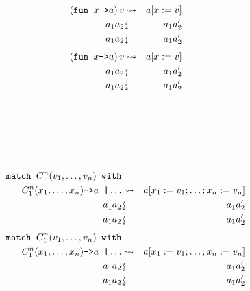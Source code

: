 \documentclass{beamer}
\newcommand{\assign}{:=}
\newcommand{\downsquigarrow}{{\mbox{\rotatebox[origin=c]{-90}{$\rightsquigarrow$}}}}
\newcommand{\tmverbatim}[1]{\text{{\ttfamily{#1}}}}
\begin{document}
\begin{eqnarray*}
  \left( \text{\tmverbatim{fun }} x \text{\tmverbatim{->}} a \right) v &
  \rightsquigarrow & a [x \assign v]\\
  a_1 a_2 & \downsquigarrow & a_1 a_2'\\
  a_1 a_2 & \downsquigarrow & a_1 a_2'
\end{eqnarray*}
{\newpage}
\begin{eqnarray*}
  \left( \text{\tmverbatim{fun }} x \text{\tmverbatim{->}} a \right) v &
  \rightsquigarrow & a [x \assign v]\\
  a_1 a_2 & \downsquigarrow & a_1 a_2'\\
  a_1 a_2 & \downsquigarrow & a_1 a_2'
\end{eqnarray*}
{\hlstd{ \ }}{}{\hlopt{+ }}{\hlopt{(}}{}{\hlopt{+
}}{\hlopt{(}}{}{}{}{\hlendline{}}\\
{\hlstd{ \ \ \ \ \ \ \ \ \ \ \ \ \ \ }}{\hlopt{\textbar }}{}{\hlopt{-> }}{}{\hlendline{}}\\
{\hlstd{ \ \ \ }}{\hlopt{ \ \ \ \ \ \ \ \ \ \ \textbar }}{}{\hlopt{(}}{}{\hlopt{, }}{}{\hlopt{) -> }}{}{\hlopt{+ }}{\hlopt{(}}{}{\hlopt{(}}{}{}{\hlopt{->}}{\hlendline{}}\\
{\hlstd{ \ \ \ \ \ \ \ \ \ \ \ \ \ \ \ \ }}{}{}{}{\hlendline{}}\\
{\hlstd{ \ \ \ \ \ \ \ \ \ \ \ \ \ \ }}{\hlopt{ \ \ \ \textbar }}{}{\hlopt{-> }}{}{\hlendline{}}\\
{\hlstd{ \ \ \ }}{\hlopt{ \ \ \ \ \ \ \ \ \ \ \ \ \ \ \textbar }}{}{\hlopt{(}}{}{\hlopt{, }}{}{\hlopt{) -> }}{}{\hlopt{+ }}{}{\hlopt{))}}{}{\hlopt{)}}{\hlopt{)}}
\begin{eqnarray*}
  \text{\tmverbatim{match }} C_1^n (v_1, \ldots, v_n) \text{\tmverbatim{
  with}} &  & \\
  C_1^n (x_1, \ldots, x_n) \text{\tmverbatim{->}} a \text{\tmverbatim{
  \textbar }} \ldots & \rightsquigarrow & a [x_1 \assign v_1 ; \ldots ; x_n
  \assign v_n]\\
  a_1 a_2 & \downsquigarrow & a_1 a_2'\\
  a_1 a_2 & \downsquigarrow & a_1 a_2'
\end{eqnarray*}
{\newpage}
\begin{eqnarray*}
  \text{\tmverbatim{match }} C_1^n (v_1, \ldots, v_n) \text{\tmverbatim{
  with}} &  & \\
  C_1^n (x_1, \ldots, x_n) \text{\tmverbatim{->}} a \text{\tmverbatim{
  \textbar }} \ldots & \rightsquigarrow & a [x_1 \assign v_1 ; \ldots ; x_n
  \assign v_n]\\
  a_1 a_2 & \downsquigarrow & a_1 a_2'\\
  a_1 a_2 & \downsquigarrow & a_1 a_2'
\end{eqnarray*}
\end{document}
